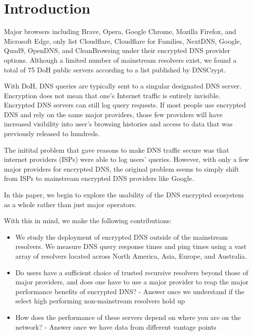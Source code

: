 \section{Introduction}\label{sec:intro}

Major browsers including Brave, Opera, Google Chrome, Mozilla Firefox, and Microsoft Edge, only list Cloudflare, Cloudflare for Families, NextDNS, Google, Quad9, OpenDNS, and CleanBrowsing under their encrypted DNS provider options.
Although a limited number of mainstream resolvers exist, we found a total of 75 DoH public servers according to a list published by DNSCrypt.

With DoH, DNS queries are typically sent to a singular designated DNS server.
Encryption does not mean that one's Internet traffic is entirely invisible. 
Encrypted DNS servers can still log query requests.   
If most people use encrypted DNS and rely on the same major providers, those few providers will have increased visibility into user's browsing histories and access to data that was previously released to hundreds. 

The initital problem that gave reasons to make DNS traffic secure was that internet providers (ISPs) were able to log users' queries. 
However, with only a few major providers for encrypted DNS, the original problem seems to simply shift from ISPs to mainstream encrypted DNS providers like Google. 

In this paper, we begin to explore the usability of the DNS encrypted ecosystem as a whole rather than just major operators. 

With this in mind, we make the following contributions:

\begin{itemize}
\setlength\itemsep{0em}
\item We study the deployment of encrypted DNS outside of the mainstream resolvers. We measure DNS query response times and ping times using a vast array of resolvers located across North America, Asia, Europe, and Australia. 
\item Do users have a sufficient choice of trusted recursive resolvers beyond those of major providers, and does one have to use a major provider to reap the major performance benefits of encrypted DNS?
	- Answer once we understand if the select high performing non-mainstream resolvers hold up 
\item How does the performance of these servers depend on where you are on the network?
	- Answer once we have data from different vantage points 

\end{itemize}
